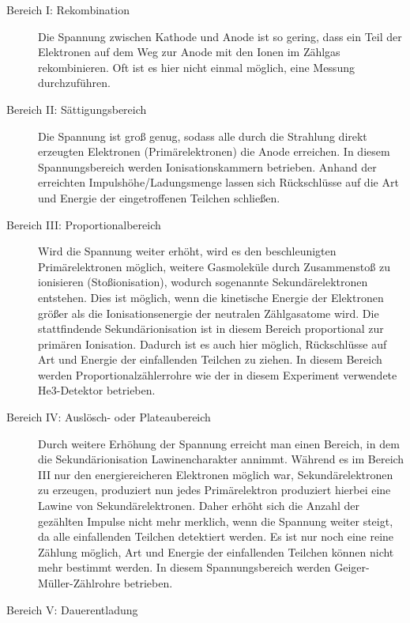 \begin{description}
	\item[Bereich I: Rekombination] Die Spannung zwischen Kathode und Anode ist so gering, dass ein Teil der Elektronen auf dem Weg zur Anode mit den Ionen im Zählgas rekombinieren. Oft ist es hier nicht einmal möglich, eine Messung durchzuführen.  

	\item[Bereich II: Sättigungsbereich] Die Spannung ist groß genug, sodass alle durch die Strahlung direkt erzeugten Elektronen (Primärelektronen) die Anode erreichen. In diesem Spannungsbereich werden Ionisationskammern betrieben. Anhand der erreichten Impulshöhe/Ladungsmenge lassen sich Rückschlüsse auf die Art und Energie der eingetroffenen Teilchen schließen. 
	
	\item[Bereich III: Proportionalbereich] Wird die Spannung weiter erhöht, wird es den beschleunigten Primärelektronen möglich, weitere Gasmoleküle durch Zusammenstoß zu ionisieren (Stoßionisation), wodurch sogenannte Sekundärelektronen entstehen. Dies ist möglich, wenn die kinetische Energie der Elektronen größer als die Ionisationsenergie der neutralen Zählgasatome wird. Die stattfindende Sekundärionisation ist in diesem Bereich proportional zur primären Ionisation. Dadurch ist es auch hier möglich, Rückschlüsse auf Art und Energie der einfallenden Teilchen zu ziehen. In diesem Bereich werden Proportionalzählerrohre wie der in diesem Experiment verwendete He3-Detektor betrieben.
	
	\item [Bereich IV: Auslösch- oder Plateaubereich] Durch weitere Erhöhung der Spannung erreicht man einen Bereich, in dem die Sekundärionisation Lawinencharakter annimmt. Während es im Bereich III nur den energiereicheren Elektronen möglich war, Sekundärelektronen zu erzeugen, produziert nun jedes Primärelektron produziert hierbei eine Lawine von Sekundärelektronen. Daher erhöht sich die Anzahl der gezählten Impulse nicht mehr merklich, wenn die Spannung weiter steigt, da alle einfallenden Teilchen detektiert werden. Es ist nur noch eine reine Zählung möglich, Art und Energie der einfallenden Teilchen können nicht mehr bestimmt werden. In diesem Spannungsbereich werden Geiger-Müller-Zählrohre betrieben. 
	\item [Bereich V: Dauerentladung]
\end{description}


